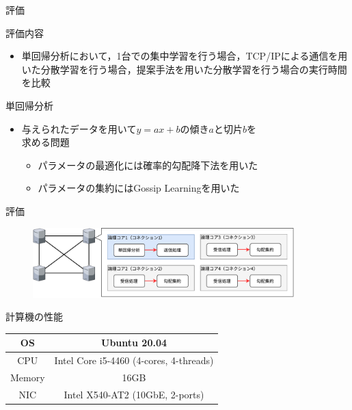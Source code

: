 \documentclass[12pt, unicode]{beamer}
\begin{document}
\begin{frame}{評価}
  \begin{block}{評価内容}
    \begin{itemize}
      \item 単回帰分析において，1台での集中学習を行う場合，TCP/IPによる通信を用いた分散学習を行う場合，提案手法を用いた分散学習を行う場合の実行時間を比較
    \end{itemize}
  \end{block}

  \begin{block}{単回帰分析}
    \begin{itemize}
      \item 与えられたデータを用いて$y = ax + b$の傾き$a$と切片$b$を\\求める問題
      \begin{itemize}
        \item パラメータの最適化には確率的勾配降下法を用いた
        \item パラメータの集約にはGossip Learningを用いた
      \end{itemize}
    \end{itemize}
  \end{block}
\end{frame}

\begin{frame}{評価}
  \begin{figure}[h]
    \centering
    \includegraphics[width=0.9\textwidth]{pictures/EvaluationNetwork.pdf}
  \end{figure}

  \begin{block}{計算機の性能}
    \begin{table}[htb]
      \begin{tabular}{|c|c|} \hline
        OS     & Ubuntu 20.04                            \\ \hline
        CPU    & Intel Core i5-4460 (4-cores, 4-threads) \\ \hline
        Memory & 16GB                                    \\ \hline
        NIC    & Intel X540-AT2 (10GbE, 2-ports)         \\ \hline
      \end{tabular}
    \end{table}
  \end{block}
\end{frame}
\end{document}
